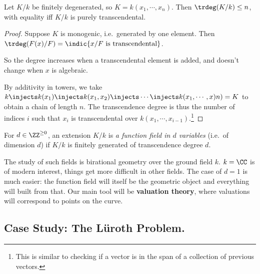 \begin{theorem}

Let \(K/k\) be finitely degenerated, so \(K = k(x_1, \cdots, x_n)\).
Then \(\trdeg(K/k) \leq n\), with equality iff \(K/k\) is purely
transcendental.

\end{theorem}

\begin{proof}

Suppose \(K\) is monogenic, i.e.~generated by one element. Then
\(\trdeg(F(x)/F) = \indic{x/F\text{ is transcendental}}\).

So the degree increases when a transcendental element is added, and
doesn't change when \(x\) is algebraic.

By additivity in towers, we take
\(k \injects k(x_1) \injects k(x_1, x_2) \injects \cdots \injects k(x_1, \cdots, x)n) = K\)
to obtain a chain of length \(n\). The transcendence degree is thus the
number of indices \(i\) such that \(x_i\) is transcendental over
\(k(x_1, \cdots, x_{i-1})\).\footnote{This is similar to checking if a
  vector is in the span of a collection of previous vectors.}

\end{proof}

\begin{definition}

For \(d\in\ZZ^{\geq 0}\), an extension \(K/k\) is \emph{a function field
in \(d\) variables} (i.e.~of dimension \(d\)) if \(K/k\) is finitely
generated of transcendence degree \(d\).

\end{definition}

\begin{remark}

The study of such fields is birational geometry over the ground field
\(k\). \(k=\CC\) is of modern interest, things get more difficult in
other fields. The case of \(d=1\) is much easier: the function field
will itself be the geometric object and everything will built from that.
Our main tool will be \textbf{valuation theory}, where valuations will
correspond to points on the curve.

\end{remark}

\hypertarget{case-study-the-luxfcroth-problem.}{%
\subsection{Case Study: The Lüroth
Problem.}\label{case-study-the-luxfcroth-problem.}}

